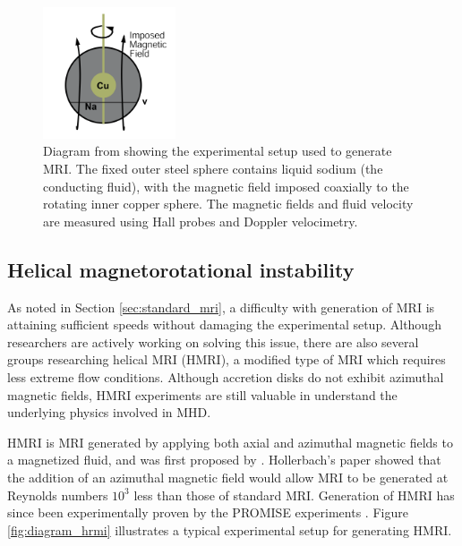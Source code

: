 \documentclass{jfm}
\begin{document}
\begin{figure}
    \centering
    \includegraphics[width=0.35\textwidth]{Sisan2004_diagram}
    \caption{Diagram from \cite{Sisan2004} showing the experimental setup used to generate MRI. The fixed outer steel sphere contains liquid sodium (the conducting fluid), with the magnetic field imposed coaxially to the rotating inner copper sphere. The magnetic fields and fluid velocity are measured using Hall probes and Doppler velocimetry.}
    \label{fig:diagram_Sisan}
\end{figure}



%
%
\subsection{Helical magnetorotational instability}

As noted in Section \ref{sec:standard_mri}, a difficulty with generation of
MRI is attaining sufficient speeds without damaging the experimental setup. 
Although researchers are actively working on solving this issue, there are also
several groups researching helical MRI (HMRI), a modified type of MRI which requires 
less extreme flow conditions. Although accretion disks do not exhibit azimuthal
magnetic fields, HMRI experiments are still valuable in understand the underlying
physics involved in MHD.

HMRI is MRI generated by applying both axial and azimuthal magnetic fields to a 
magnetized fluid, and was first proposed by \cite{Hollerbach2005}. Hollerbach's
paper showed that the addition of an azimuthal magnetic field would allow MRI
to be generated at Reynolds numbers $10^3$ less than those of standard MRI. 
Generation of HMRI has since been experimentally proven by the PROMISE experiments
\citep[see][]{Stefani2006, Stefani2007, Stefani2009, Stefani2012}. Figure 
\ref{fig:diagram_hrmi} illustrates a typical experimental setup for generating HMRI.
\end{document}
